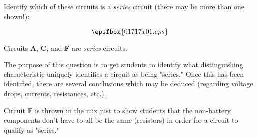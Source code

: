 

Identify which of these circuits is a {\it series} circuit (there may be more than one shown!):

$$\epsfbox{01717x01.eps}$$







Circuits {\bf A}, {\bf C}, and {\bf F} are {\it series} circuits.







The purpose of this question is to get students to identify what distinguishing characteristic uniquely identifies a circuit as being "series."  Once this has been identified, there are several conclusions which may be deduced (regarding voltage drops, currents, resistances, etc.).

Circuit {\bf F} is thrown in the mix just to show students that the non-battery components don't have to all be the same (resistors) in order for a circuit to qualify as "series."




